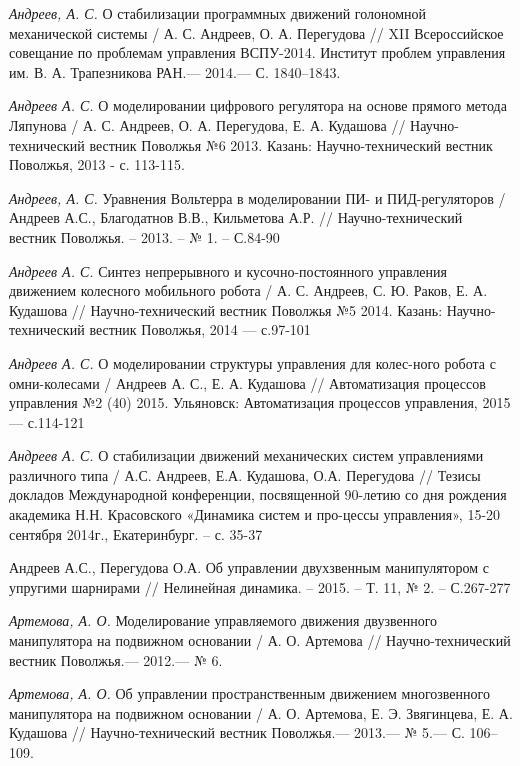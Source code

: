 \begin{thebibliography}{10}
	{\it Андреев, А. С.} О стабилизации программных движений голономной механической системы /
	А. С. Андреев, О. А. Перегудова // XII Всероссийское совещание по проблемам управления ВСПУ-2014. Институт проблем управления им. В. А. Трапезникова РАН.— 2014.— С. 1840–1843.
	
	{\it Андреев А. С.} О моделировании цифрового регулятора на основе прямого метода Ляпунова / А. С. Андреев, О. А. Перегудова, Е. А. Кудашова //
	Научно-технический вестник Поволжья №6 2013. Казань: Научно-технический вестник Поволжья, 2013 - с. 113-115.
	
	{\it Андреев, А. С.} Уравнения Вольтерра в моделировании ПИ- и ПИД-регуляторов / Андреев А.С., Благодатнов В.В., Кильметова А.Р. // Научно-технический вестник Поволжья. – 2013. – № 1. – С.84-90
	
	{\it Андреев А. С.} Синтез непрерывного и кусочно-постоянного управления движением колесного мобильного робота / А. С. Андреев, С. Ю. Раков, Е. А. Кудашова  //
	Научно-технический вестник Поволжья №5 2014. Казань: Научно-технический вестник Поволжья, 2014 — с.97-101

	{\it Андреев А. С.} О моделировании структуры управления для колес-ного робота с омни-колесами / Андреев А. С., Е. А. Кудашова // Автоматизация процессов управления №2 (40) 2015. Ульяновск: Автоматизация процессов управления, 2015 — с.114-121
	
	{\it Андреев А. С.} О стабилизации движений механических систем управлениями различного типа / А.С. Андреев, Е.А. Кудашова, О.А. Перегудова // Тезисы докладов Международной конференции, посвященной 90-летию со дня рождения академика Н.Н. Красовского «Динамика систем и про-цессы управления», 15-20 сентября 2014г., Екатеринбург. – с. 35-37

	Андреев А.С., Перегудова О.А. Об управлении двухзвенным манипулятором с упругими шарнирами // Нелинейная динамика. – 2015. – Т. 11, № 2. – С.267-277
	
	{\it Артемова, А. О.} Моделирование управляемого движения двузвенного манипулятора на подвижном основании /
	А. О. Артемова // Научно-технический вестник Поволжья.— 2012.— № 6.
	
	{\it Артемова, А. О.} Об управлении пространственным движением многозвенного манипулятора на подвижном основании /
	А. О. Артемова, Е. Э. Звягинцева, Е. А. Кудашова // Научно-технический вестник Поволжья.— 2013.— № 5.— С. 106–109.
	

\end{thebibliography}
